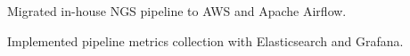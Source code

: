 \documentclass[]{resume}
\begin{document}
\begin{minipage}[t]{0.69\textwidth}
\begin{tightemize}
\item Migrated in-house NGS pipeline to AWS and Apache Airflow.
\item Implemented pipeline metrics collection with Elasticsearch and Grafana.
\end{tightemize}
\sectionsep







\end{minipage}
\end{document}
